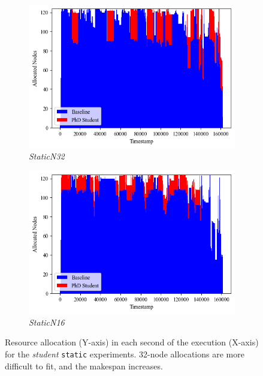 \documentclass[a4paper,fleqn]{cas-dc}
\begin{document}
\iffalse
\begin{figure}[tbp]
    \centering
    \begin{minipage}[b]{.4\textwidth}
    \begin{subfigure}[t]{\columnwidth}
        \centering
        \includegraphics[clip, width=\linewidth, trim={0.1cm 1.25cm 0.1cm 0.2cm}]{figures/StaticN32.png}
        \caption{\textit{StaticN32}}
        \label{multifig:static32}
        \vspace{3mm}
    \end{subfigure}
    \begin{subfigure}[t]{\columnwidth}
        \includegraphics[clip, width=\linewidth, trim={0.1cm 0.3cm 0.1cm 0cm}]{figures/StaticN16.png}
        \caption{\textit{StaticN16}}
        \label{multifig:static16}
    \end{subfigure}    
    \caption{
    Resource allocation (Y-axis) in each second of the execution (X-axis) for the \textit{student} \texttt{static} experiments. 32-node allocations are more difficult to fit, and the makespan increases.}
    \end{minipage}\qquad
    

\end{figure}
\end{document}
